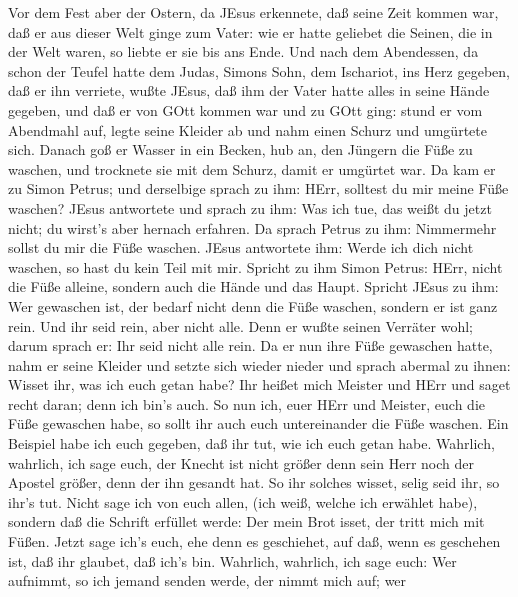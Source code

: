  Vor dem Fest aber der Ostern, da JEsus erkennete, daß seine
Zeit kommen war, daß er aus dieser Welt ginge zum Vater: wie er hatte
geliebet die Seinen, die in der Welt waren, so liebte er sie bis ans
Ende.  Und nach dem Abendessen, da schon der Teufel hatte
dem Judas, Simons Sohn, dem Ischariot, ins Herz gegeben, daß er ihn
verriete,  wußte JEsus, daß ihm der Vater hatte alles in
seine Hände gegeben, und daß er von GOtt kommen war und zu GOtt ging:
 stund er vom Abendmahl auf, legte seine Kleider ab und nahm
einen Schurz und umgürtete sich.  Danach goß er Wasser in
ein Becken, hub an, den Jüngern die Füße zu waschen, und trocknete sie
mit dem Schurz, damit er umgürtet war.  Da kam er zu Simon
Petrus; und derselbige sprach zu ihm: HErr, solltest du mir meine Füße
waschen?  JEsus antwortete und sprach zu ihm: Was ich tue,
das weißt du jetzt nicht; du wirst's aber hernach erfahren. 
Da sprach Petrus zu ihm: Nimmermehr sollst du mir die Füße waschen.
JEsus antwortete ihm: Werde ich dich nicht waschen, so hast du kein Teil
mit mir.  Spricht zu ihm Simon Petrus: HErr, nicht die Füße
alleine, sondern auch die Hände und das Haupt.  Spricht
JEsus zu ihm: Wer gewaschen ist, der bedarf nicht denn die Füße waschen,
sondern er ist ganz rein. Und ihr seid rein, aber nicht alle.
 Denn er wußte seinen Verräter wohl; darum sprach er: Ihr
seid nicht alle rein.  Da er nun ihre Füße gewaschen hatte,
nahm er seine Kleider und setzte sich wieder nieder und sprach abermal
zu ihnen: Wisset ihr, was ich euch getan habe?  Ihr heißet
mich Meister und HErr und saget recht daran; denn ich bin's auch.
 So nun ich, euer HErr und Meister, euch die Füße gewaschen
habe, so sollt ihr auch euch untereinander die Füße waschen.
 Ein Beispiel habe ich euch gegeben, daß ihr tut, wie ich
euch getan habe.  Wahrlich, wahrlich, ich sage euch, der
Knecht ist nicht größer denn sein Herr noch der Apostel größer, denn der
ihn gesandt hat.  So ihr solches wisset, selig seid ihr, so
ihr's tut.  Nicht sage ich von euch allen, (ich weiß,
welche ich erwählet habe), sondern daß die Schrift erfüllet werde: Der
mein Brot isset, der tritt mich mit Füßen.  Jetzt sage
ich's euch, ehe denn es geschiehet, auf daß, wenn es geschehen ist, daß
ihr glaubet, daß ich's bin.  Wahrlich, wahrlich, ich sage
euch: Wer aufnimmt, so ich jemand senden werde, der nimmt mich auf; wer
